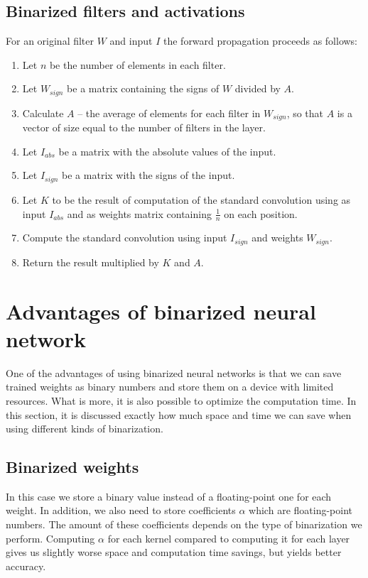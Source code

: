 \documentclass[licencjacka]{pracamgr}
\begin{document}
		\section{Binarized filters and activations}
		        For an original filter $W$ and input $I$ the forward propagation proceeds as follows:
		        \begin{enumerate}
		                \item Let $n$ be the number of elements in each filter.
		                \item Let $W_{sign}$ be a matrix containing the signs of $W$ divided by $A$.
		                \item Calculate $A$ -- the average of elements for each filter in $W_{sign}$, so that $A$ is a vector of size equal to the number of filters in the layer.
		                \item Let $I_{abs}$ be a matrix with the absolute values of the input.
		                \item Let $I_{sign}$ be a matrix with the signs of the input.
		                \item Let $K$ to be the result of computation of the standard convolution using as input $I_{abs}$ and as weights matrix containing $\frac{1}{n}$ on each position.
		                \item Compute the standard convolution using input $I_{sign}$ and weights $W_{sign}$.
		                \item Return the result multiplied by $K$ and $A$.
		        \end{enumerate}

	\chapter{Advantages of binarized neural network}
    One of the advantages of using binarized neural networks is that we can save trained weights as binary numbers and store them on a device with limited resources. What is more, it is also possible to optimize the computation time. In this section, it is discussed exactly how much space and time we can save when using different kinds of binarization.
    
    \section{Binarized weights}
        In this case we store a binary value instead of a floating-point one for each weight. In addition, we also need to store coefficients $\alpha$ which are floating-point numbers. The amount of these coefficients depends on the type of binarization we perform. Computing $\alpha$ for each kernel compared to computing it for each layer gives us slightly worse space and computation time savings, but yields better accuracy.
        
\end{document}
